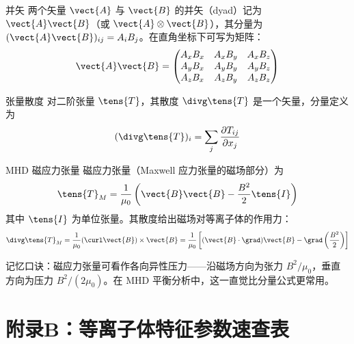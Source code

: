 \begin{definition}{并矢}{}
两个矢量 $\vect{A}$ 与 $\vect{B}$ 的并矢（dyad）记为 $\vect{A}\vect{B}$（或 $\vect{A}\otimes\vect{B}$），其分量为 $(\vect{A}\vect{B})_{ij}=A_iB_j$。在直角坐标下可写为矩阵：
\begin{equation}
\vect{A}\vect{B} =
\begin{pmatrix}
A_xB_x & A_xB_y & A_xB_z \\
A_yB_x & A_yB_y & A_yB_z \\
A_zB_x & A_zB_y & A_zB_z
\end{pmatrix}
\end{equation}
\end{definition}

\begin{definition}{张量散度}{}
对二阶张量 $\tens{T}$，其散度 $\divg\tens{T}$ 是一个矢量，分量定义为
\begin{equation}
(\divg\tens{T})_i = \sum_j \frac{\partial T_{ij}}{\partial x_j}
\end{equation}
\end{definition}

\begin{theorem}{MHD 磁应力张量}{}
磁应力张量（Maxwell 应力张量的磁场部分）为
\begin{equation}
\tens{T}_M = \frac{1}{\mu_0}\left(\vect{B}\vect{B} - \frac{B^2}{2}\tens{I}\right)
\end{equation}
其中 $\tens{I}$ 为单位张量。其散度给出磁场对等离子体的作用力：
\begin{equation}
\divg\tens{T}_M = \frac{1}{\mu_0}(\curl\vect{B})\times\vect{B}
= \frac{1}{\mu_0}\left[ (\vect{B}\cdot\grad)\vect{B} - \grad\left(\frac{B^2}{2}\right) \right]
\end{equation}
\end{theorem}

\begin{tip}
记忆口诀：磁应力张量可看作各向异性压力——沿磁场方向为张力 $B^2/\mu_0$，垂直方向为压力 $B^2/(2\mu_0)$。在 MHD 平衡分析中，这一直觉比分量公式更常用。
\end{tip}


\chapter*{附录B：等离子体特征参数速查表}

